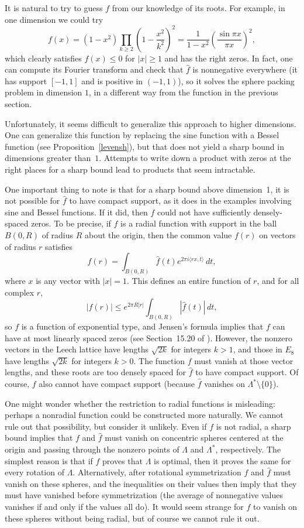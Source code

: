 It is natural to try to guess $f$ from our knowledge of its roots.
For example, in one dimension we could try
$$
f(x) = (1-x^2) \prod_{k \ge 2} \left(1 - \frac{x^2}{k^2}\right)^2
= \frac{1}{1-x^2}\left(\frac{\sin \pi x}{\pi x}\right)^2,
$$
which clearly satisfies $f(x) \le 0$ for $|x| \ge 1$ and has the
right zeros. In fact, one can compute its Fourier transform and
check that $\widehat{f}$ is nonnegative everywhere (it has
support $[-1,1]$ and is positive in $(-1,1)$), so it solves the
sphere packing problem in dimension $1$, in a different way from
the function in the previous section.

Unfortunately, it seems difficult to generalize this approach to
higher dimensions.  One can generalize this function by replacing
the sine function with a Bessel function (see
Proposition~\ref{levensh}), but that does not yield a sharp bound
in dimensions greater than~$1$.  Attempts to write down a product
with zeros at the right places for a sharp bound lead to products
that seem intractable.

One important thing to note is that for a sharp bound above
dimension~1, it is not possible for $\widehat{f}$ to have compact
support, as it does in the examples involving sine and Bessel
functions. If it did, then $f$ could not have sufficiently
densely-spaced zeros. To be precise, if $\widehat{f}$ is a radial
function with support in the ball $B(0,R)$ of radius $R$ about
the origin, then the common value $f(r)$ on vectors of radius $r$
satisfies
$$
f(r) = \int_{B(0,R)} \widehat{f}(t) e^{2\pi  i \langle rx, t
\rangle} \, dt,
$$
where $x$ is any vector with $|x|=1$. This defines an entire
function of $r$, and for all complex $r$,
$$
|f(r)| \le e^{2\pi R |r|} \int_{B(0,R)} |\widehat{f}(t)| \, dt,
$$
so $f$ is a function of exponential type, and Jensen's formula
implies that $f$ can have at most linearly spaced zeros (see
Section~15.20 of \cite{Ru}).  However, the nonzero vectors in
the Leech lattice have lengths $\sqrt{2k}$ for integers $k>1$,
and those in $E_8$ have lengths $\sqrt{2k}$ for integers $k>0$.
The function $f$ must vanish at those vector lengths, and these
roots are too densely spaced for $\widehat{f}$ to have compact
support.  Of course, $f$ also cannot have compact support
(because $\widehat{f}$ vanishes on $\Lambda^*\setminus\{0\}$).

One might wonder whether the restriction to radial functions is
misleading: perhaps a nonradial function could be constructed
more naturally.  We cannot rule out that possibility, but consider
it unlikely.  Even if $f$ is not radial, a sharp bound implies
that $f$ and $\widehat{f}$ must vanish on concentric spheres
centered at the origin and passing through the nonzero points of
$\Lambda$ and $\Lambda^*$, respectively.  The simplest reason is
that if $f$ proves that $\Lambda$ is optimal, then it proves the
same for every rotation of $\Lambda$.  Alternatively, after
rotational symmetrization $f$ and $\widehat{f}$ must vanish on
these spheres, and the inequalities on their values then imply
that they must have vanished before symmetrization (the average
of nonnegative values vanishes if and only if the values all do).
It would seem strange for $f$ to vanish on these spheres without
being radial, but of course we cannot rule it out.

